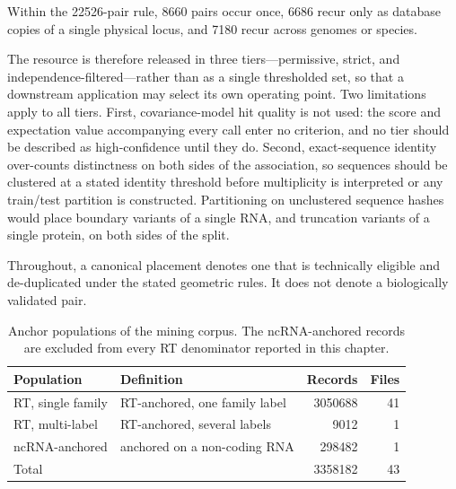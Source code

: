 Within the \num{22526}-pair rule, \num{8660} pairs occur once, \num{6686} recur only as database
copies of a single physical locus, and \num{7180} recur across genomes or species.

The resource is therefore released in three tiers---permissive, strict, and
independence-filtered---rather than as a single thresholded set, so that a downstream application
may select its own operating point. Two limitations apply to all tiers. First, covariance-model hit
quality is not used: the score and expectation value accompanying every call enter no criterion, and
no tier should be described as high-confidence until they do. Second, exact-sequence identity
over-counts distinctness on both sides of the association, so sequences should be clustered at a
stated identity threshold before multiplicity is interpreted or any train/test partition is
constructed. Partitioning on unclustered sequence hashes would place boundary variants of a single
RNA, and truncation variants of a single protein, on both sides of the split.

Throughout, a canonical placement denotes one that is technically eligible and de-duplicated under
the stated geometric rules. It does not denote a biologically validated pair.


\begin{table}[htbp]
\centering
\caption[Anchor populations of the mining corpus]{Anchor populations of the mining corpus. The
ncRNA-anchored records are excluded from every RT denominator reported in this chapter.}
\label{tab:populations}
\begin{tabular}{llrr}
\toprule
Population & Definition & Records & Files \\
\midrule
RT, single family & RT-anchored, one family label   & \num{3050688} & 41 \\
RT, multi-label   & RT-anchored, several labels     & \num{9012}    & 1  \\
ncRNA-anchored    & anchored on a non-coding RNA    & \num{298482}  & 1  \\
\midrule
Total             &                                 & \num{3358182} & 43 \\
\bottomrule
\end{tabular}
\end{table}

